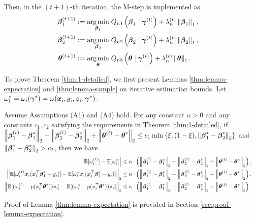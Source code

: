 Then, in the $(t+1)$-th iteration, the M-step is implemented as 
\begin{align}
    \boldsymbol{\beta}_1^{(t+1)} & := \underset{\boldsymbol{\beta}_1}{\arg\min} \;  Q_{n1}\left( \boldsymbol{\beta}_1 \;|\; \boldsymbol{\gamma}^{(t)} \right)  
    + \lambda_n^{(t)} \left\lVert\boldsymbol{\beta}_1\right\rVert_1,  \label{eqn:beta-1-opt}\\
    \boldsymbol{\beta}_2^{(t+1)} & := \underset{\boldsymbol{\beta}_2}{\arg\min} \; Q_{n2}\left( \boldsymbol{\beta}_2 \;|\; \boldsymbol{\gamma}^{(t)} \right)  
    + \lambda_n^{(t)} \left\lVert\boldsymbol{\beta}_2\right\rVert_1,  \label{eqn:beta-2-opt} \\
    \boldsymbol{\theta}^{(t+1)} & := \underset{\boldsymbol{\theta}}{\arg\min} \; Q_{n3}\left( \boldsymbol{\theta} \;|\; \boldsymbol{\gamma}^{(t)} \right) 
    + \lambda_n^{(t)} \left\lVert\boldsymbol{\theta}\right\rVert_1.  \label{eqn:theta-opt}
\end{align}


To prove Theorem \ref{thm:1-detailed}, we first present Lemmas \ref{thm:lemma-expectation} and \ref{thm:lemma-sample} on iterative estimation bounds. Let $\omega_i^* = \omega_i(\boldsymbol{\gamma}^*) = \omega(\boldsymbol{x}_i, y_i, \boldsymbol{z}_i ; \boldsymbol{\gamma}^*)$.

\begin{lemma}  
\label{thm:lemma-expectation}
Assume Assumptions (A1) and (A4) hold.  For any constant $\kappa>0$ and any constants $c_1, c_2$ satisfying the requirements in Theorem \ref{thm:1-detailed}, 
if $\left\lVert\boldsymbol{\beta}_1^{(t)} - \boldsymbol{\beta}_1^*\right\rVert_2 + \left\lVert\boldsymbol{\beta}_2^{(t)} - \boldsymbol{\beta}_2^*\right\rVert_2 + \left\lVert\boldsymbol{\theta}^{(t)} - \boldsymbol{\theta}^*\right\rVert_2 \le c_1 \min\left\{ \xi, (1-\xi), \left\lVert\boldsymbol{\beta}_1^*-\boldsymbol{\beta}_2^*\right\rVert_2 \right\}$ and $\left\lVert\boldsymbol{\beta}_1^*-\boldsymbol{\beta}_2^*\right\rVert_2 > c_2$, then we have
\begin{align*}
    \left\lvert \mathbb{E}[\omega_i^{(t)} ] 
        - \mathbb{E}[\omega_i^*] \right\rvert  
    & \le \kappa \cdot \left( \left\lVert\boldsymbol{\beta}_1^{(t)} - \boldsymbol{\beta}_1^*\right\rVert_2 + \left\lVert\boldsymbol{\beta}_2^{(t)} - \boldsymbol{\beta}_2^*\right\rVert_2 + \left\lVert\boldsymbol{\theta}^{(t)} - \boldsymbol{\theta}^*\right\rVert_2 \right), 
    \\
    \left\lVert \mathbb{E}[ \omega_i^{(t)} \boldsymbol{x}_i ( \boldsymbol{x}_i^\top \boldsymbol{\beta}_1^* - y_i) ] 
        - \mathbb{E}[ \omega_i^* \boldsymbol{x}_i ( \boldsymbol{x}_i^\top \boldsymbol{\beta}_1^* - y_i) ] \right\rVert_2  
    & \le \kappa \cdot \left( \left\lVert\boldsymbol{\beta}_1^{(t)} - \boldsymbol{\beta}_1^*\right\rVert_2 + \left\lVert\boldsymbol{\beta}_2^{(t)} - \boldsymbol{\beta}_2^*\right\rVert_2 + \left\lVert\boldsymbol{\theta}^{(t)} - \boldsymbol{\theta}^*\right\rVert_2 \right), 
    \\
    \left\lVert \mathbb{E}[ ( \omega_i^{(t)} - p(\boldsymbol{z}_i^\top\boldsymbol{\theta}^{*}) ) \boldsymbol{z}_i ] 
       - \mathbb{E}[ (\omega_i^* - p(\boldsymbol{z}_i^\top\boldsymbol{\theta}^{*}) ) \boldsymbol{z}_i ] \right\rVert_2
    & \le  \kappa \cdot \left( \left\lVert\boldsymbol{\beta}_1^{(t)} - \boldsymbol{\beta}_1^*\right\rVert_2 + \left\lVert\boldsymbol{\beta}_2^{(t)} - \boldsymbol{\beta}_2^*\right\rVert_2 + \left\lVert\boldsymbol{\theta}^{(t)} - \boldsymbol{\theta}^*\right\rVert_2 \right). 
\end{align*}
\end{lemma}
\noindent Proof of Lemma \ref{thm:lemma-expectation} is provided in Section \ref{sec:proof-lemma-expectation}. 

